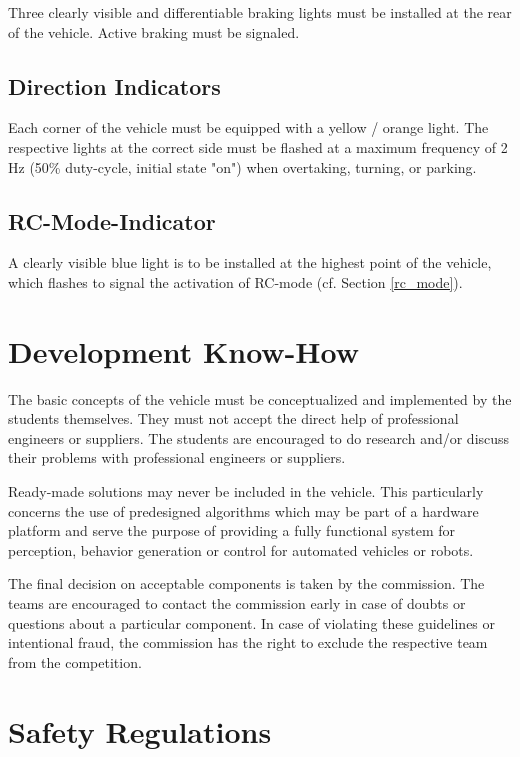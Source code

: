 \documentclass[a4paper]{report}
\begin{document}
Three clearly visible and differentiable braking lights must be installed at
the rear of the vehicle. Active braking must be signaled.

\subsection{Direction Indicators}

Each corner of the vehicle must be equipped with a yellow / orange light. The
respective lights at the correct side must be flashed at a maximum frequency of
2 Hz (50\% duty-cycle, initial state "on") when overtaking, turning, or
parking.

\subsection{RC-Mode-Indicator}

A clearly visible blue light is to be installed at the highest point of the
vehicle, which flashes to signal the activation of RC-mode (cf. Section
\ref{rc_mode}).

\section{Development Know-How}
\label{dev_know_how}

The basic concepts of the vehicle must be conceptualized and implemented by the
students themselves. They must not accept the direct help of professional
engineers or suppliers. The students are encouraged to do research and/or
discuss their problems with professional engineers or suppliers.

Ready-made solutions may never be included in the vehicle. This particularly
concerns the use of predesigned algorithms which may be part of a hardware
platform and serve the purpose of providing a fully functional system for
perception, behavior generation or control for automated vehicles or robots.

The final decision on acceptable components is taken by the commission. The
teams are encouraged to contact the commission early in case of doubts or
questions about a particular component. In case of violating these guidelines
or intentional fraud, the commission has the right to exclude the respective
team from the competition.

\section{Safety Regulations}
\end{document}
